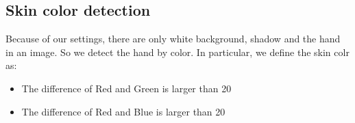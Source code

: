 \subsection{Skin color detection}
Because of our settings, there are only white background, shadow and the hand in an image.
So we detect the hand by color. 
In particular, we define the skin colr as:
\begin{itemize}
  \item The difference of Red and Green is larger than 20
  \item The difference of Red and Blue is larger than 20
 \end{itemize}
